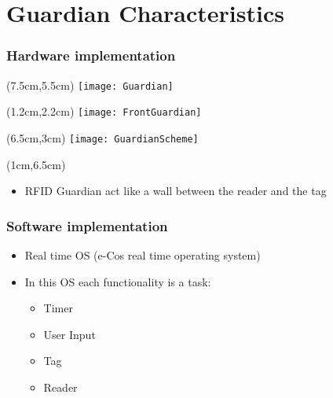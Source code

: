 \section{Guardian Characteristics}
\begin{frame}
 \frametitle{Hardware implementation}

 \begin{textblock*}{5cm}(7.5cm,5.5cm)
  \texttt{[image: Guardian]}
 \end{textblock*}

 \begin{textblock*}{5cm}(1.2cm,2.2cm)
  \texttt{[image: FrontGuardian]}
 \end{textblock*}

 \begin{textblock*}{5cm}(6.5cm,3cm)
  \texttt{[image: GuardianScheme]}
 \end{textblock*}

 \begin{textblock*}{5cm}(1cm,6.5cm)
  \begin{itemize}
   \item RFID Guardian act like a wall between the reader and the tag
  \end{itemize}
 \end{textblock*}

\end{frame}

\begin{frame}
 \frametitle{Software implementation}

 \begin{itemize}
  \item<1-> Real time OS (e-Cos real time operating system)
  \item<2-> In this OS each functionality is a task:
  \begin{itemize}
   \item Timer
   \item User Input
   \item Tag
   \item Reader
  \end{itemize}

 \end{itemize}


\end{frame}
